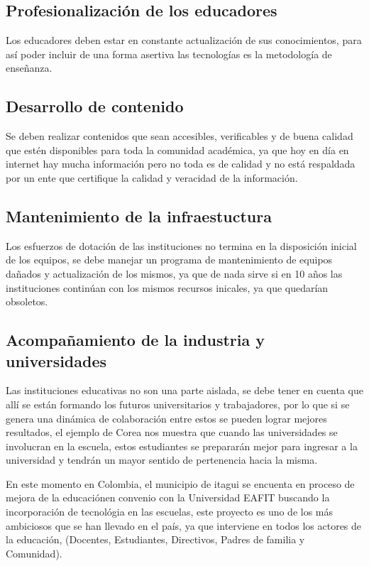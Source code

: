 \documentclass[conference]{IEEEtran}
\begin{document}
\subsection{Profesionalización de los educadores} 
Los educadores deben estar en constante actualización de sus conocimientos, para así poder incluir de una forma asertiva las tecnologías es la metodología de enseñanza.

\subsection{Desarrollo de contenido}
Se deben realizar contenidos que sean accesibles, verificables y de buena calidad que estén disponibles para toda la comunidad académica, ya que hoy en día en internet hay mucha información pero no toda es de calidad y no está respaldada por un ente que certifique la calidad y veracidad de la información.

\subsection{Mantenimiento de la infraestuctura}
Los esfuerzos de dotación de las instituciones no termina en la disposición inicial de los equipos, se debe manejar un programa de mantenimiento de equipos dañados y actualización de los mismos, ya que de nada sirve si en 10 años las instituciones continúan con los mismos recursos inicales, ya que quedarían obsoletos.

\subsection{Acompañamiento de la industria y universidades}   
Las instituciones educativas no son una parte aislada, se debe tener en cuenta que allí se están formando los futuros universitarios y trabajadores, por lo que si se genera una dinámica de colaboración entre estos se pueden lograr mejores resultados, el ejemplo de Corea nos muestra que cuando las universidades se involucran en la escuela, estos estudiantes se prepararán mejor para ingresar a la universidad y tendrán un mayor sentido de pertenencia hacia la misma. 


En este momento en Colombia, el municipio de itagui se encuenta en proceso de mejora de la educaciónen convenio con la Universidad EAFIT buscando la incorporación de tecnológia en las escuelas\cite{teso}, este proyecto es uno de los más ambiciosos que se han llevado en el país, ya que interviene en todos los actores de la educación, (Docentes, Estudiantes, Directivos, Padres de familia y Comunidad).
\end{document}

